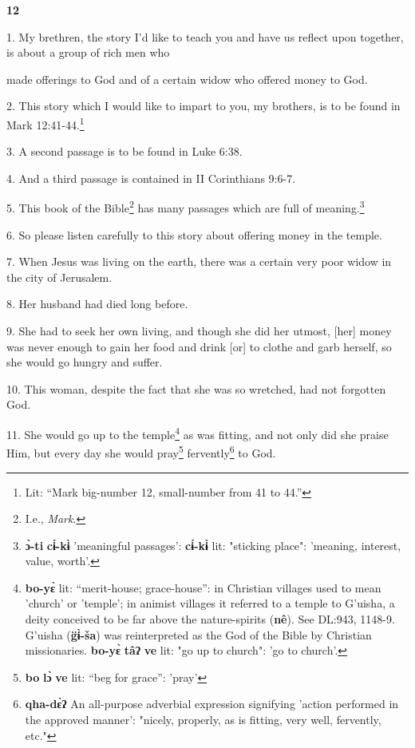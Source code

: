 \setcounter{footnote}{0}


\textbf{12}

1. My brethren, the story I'd like to teach you and have us reflect upon together,
is about a group of rich men who

made offerings to God and of a certain widow who offered money to God.

2. This story which I would like to impart to you, my brothers, is to be found in
Mark 12:41-44.\footnote{Lit: ``Mark big-number 12, small-number from 41 to 44.''}

3. A second passage is to be found in Luke 6:38.

4. And a third passage is contained in II Corinthians 9:6-7.

5. This book of the Bible\footnote{I.e., \textit{Mark}.} has many passages which are full of meaning.\footnote{\textbf{ɔ̀-ti} \textbf{cɨ́-kɨ̀} 'meaningful passages': \textbf{cɨ́-kɨ̀} lit: "sticking place": 'meaning, interest, value, worth'.}

6. So please listen carefully to this story about offering money in the temple.

7. When Jesus was living on the earth, there was a certain very poor widow in the
city of Jerusalem.

8. Her husband had died long before.

9. She had to seek her own living, and though she did her utmost, [her] money was
never enough to gain her food and drink [or] to clothe and garb herself, so she
would go hungry and suffer.

10. This woman, despite the fact that she was so wretched, had not forgotten God.

11. She would go up to the temple\footnote{\textbf{bo-yɛ̀} lit: ``merit-house; grace-house'': in Christian villages used to mean 'church' or 'temple'; in animist villages it referred to a temple to G'uisha, a deity conceived to be far above the nature-spirits (\textbf{nê}). See DL:943, 1148-9. G'uisha (\textbf{g̈ɨ̀-ša}) was reinterpreted as the God of the Bible by Christian missionaries. \textbf{bo-yɛ̀} \textbf{tâʔ} \textbf{ve} lit: "go up to church": 'go to church'.} as was fitting, and not only did she praise
Him, but every day she would pray\footnote{\textbf{bo} \textbf{lɔ̀} \textbf{ve} lit: ``beg for grace'': 'pray'} fervently\footnote{\textbf{qha-dɛ̀ʔ} An all-purpose adverbial expression signifying 'action performed in the approved manner': "nicely, properly, as is fitting, very well, fervently, etc."} to God.

